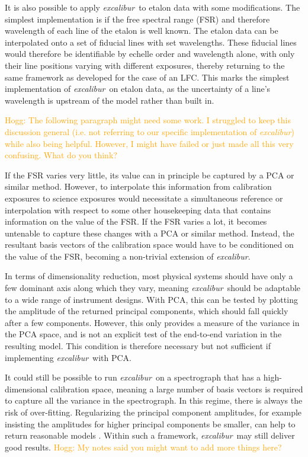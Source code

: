 \documentclass[modern]{aastex63}
\newcommand{\project}[1]{\textsl{#1}}
\newcommand{\name}{\project{excalibur}}
\newcommand{\lz}[1]{\textcolor{orange}{#1}}
\begin{document}
It is also possible to apply \name\ to etalon data with some modifications.  The simplest implementation is if the free spectral range (FSR) and therefore wavelength of each line of the etalon is well known.  The etalon data can be interpolated onto a set of fiducial lines with set wavelengths.  These fiducial lines would therefore be identifiable by echelle order and wavelength alone, with only their line positions varying with different exposures, thereby returning to the same framework as developed for the case of an LFC.  This marks the simplest implementation of \name\ on etalon data, as the uncertainty of a line's wavelength is upstream of the model rather than built in.

\lz{Hogg: The following paragraph might need some work.  I struggled to keep this discussion general (i.e. not referring to our specific implementation of \name) while also being helpful.  However, I might have failed or just made all this very confusing.  What do you think?}

If the FSR varies very little, its value can in principle be captured by a PCA or similar method.  However, to interpolate this information from calibration exposures to science exposures would necessitate a simultaneous reference or interpolation with respect to some other housekeeping data that contains information on the value of the FSR.  If the FSR varies a lot, it becomes untenable to capture these changes with a PCA or similar method.  Instead, the resultant basis vectors of the calibration space would have to be conditioned on the value of the FSR, becoming a non-trivial extension of \name.

In terms of dimensionality reduction, most physical systems should have only a few dominant axis along which they vary, meaning \name\ should be adaptable to a wide range of instrument designs.  With PCA, this can be tested by plotting the amplitude of the returned principal components, which should fall quickly after a few components.  However, this only provides a measure of the variance in the PCA space, and is not an explicit test of the end-to-end variation in the resulting model.  This condition is therefore necessary but not sufficient if implementing \name\ with PCA.

It could still be possible to run \name\ on a spectrograph that has a high-dimensional calibration space, meaning a large number of basis vectors is required to capture all the variance in the spectrograph.  In this regime, there is always the risk of over-fitting.  Regularizing the principal component amplitudes, for example insisting the amplitudes for higher principal components be smaller, can help to return reasonable models \citep{formanmackey2015} .  Within such a framework, \name\ may still deliver good results.
\lz{Hogg: My notes said you might want to add more things here?}
\end{document}
